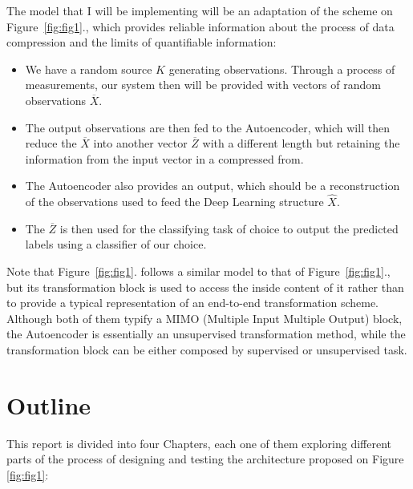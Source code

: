 The model that I will be implementing will be an adaptation of the scheme on Figure~\ref{fig:fig1}., 
%
which provides reliable information about the process of data compression and the limits of quantifiable information:
\begin{itemize}
	\item  We have a random source $K$ generating observations. Through a process of measurements, our system then will be provided with vectors of random observations $\overline{X}$. 
	
	\item The output observations  are then fed to the Autoencoder, which will then reduce the $\overline X$ into another vector $\overline Z$ with a different length but retaining the information from the input vector in a compressed from. 
	
	\item The Autoencoder also provides an output, which should be a reconstruction of the observations used to feed the Deep Learning structure $\hat X$. 
	
	\item The $\overline Z$ is then used for the classifying task of choice to output the predicted labels using a classifier of our choice. 
	
\end{itemize}

Note that Figure~\ref{fig:fig1}. follows a similar model to that of Figure~\ref{fig:fig1}., but its transformation block is used to access the inside content of it rather than to provide a typical representation of an end-to-end transformation scheme. Although both of them typify a MIMO (Multiple Input Multiple Output) block, the Autoencoder is essentially an unsupervised transformation method, while the transformation block can be either composed by supervised or unsupervised task.\par


\section{Outline}

This report is divided into four Chapters, each one of them exploring different parts of the process of designing and testing the architecture proposed on Figure \ref{fig:fig1}:

